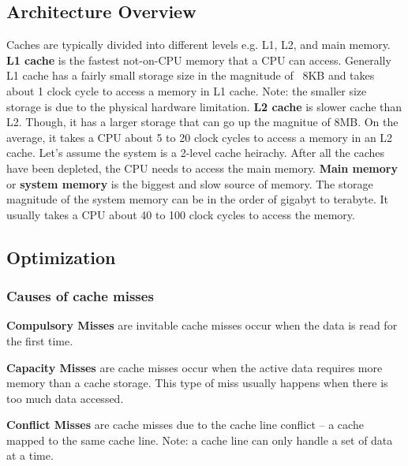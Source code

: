 \documentclass[journal]{IEEEtran}
\begin{document}
\subsection{Architecture Overview}
Caches are typically divided into different levels e.g. L1, L2, and 
main memory.
\newline
\newline
\textbf{L1 cache} is the fastest not-on-CPU memory that a CPU can access. 
Generally L1 cache has a fairly small storage size in the magnitude of ~8KB
and takes about 1 clock cycle to access a memory in L1 cache. Note: the 
smaller size storage is due to the physical hardware limitation.
\newline
\newline
\textbf{L2 cache} is slower cache than L2. Though, it has a larger storage
that can go up the magnitue of 8MB. On the average, it takes a CPU about
5 to 20 clock cycles to access a memory in an L2 cache. 
Let's assume the system is a 2-level cache heirachy. After all the caches 
have been depleted, the CPU needs to access the main memory.
\newline
\newline
\textbf{Main memory} or \textbf{system memory} is the biggest and slow source
of memory. The storage magnitude of the system memory can be in the order of
gigabyt to terabyte. It usually takes a CPU about 40 to 100 clock cycles to
access the memory. 
\newline
\newline
\subsection{Optimization}
\subsubsection{Causes of cache misses}
\begin{description}
   \item\textbf{Compulsory Misses} are invitable cache misses occur when the
      data is read for the first time.
   \item\textbf{Capacity Misses} are cache misses occur when the active data
      requires more memory than a cache storage. This type of miss usually
      happens when there is too much data accessed.
   \item\textbf{Conflict Misses} are cache misses due to the cache line 
      conflict -- a cache mapped to the same cache line. Note: a cache line 
      can only handle a set of data at a time.
      \newline
\end{description}
\end{document}
